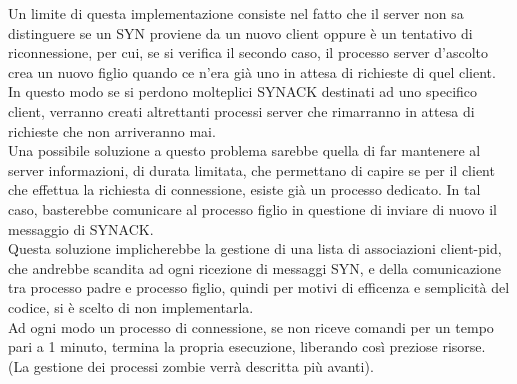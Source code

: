 Un limite di questa implementazione consiste nel fatto che il server non sa distinguere se un SYN proviene da un nuovo client oppure è un tentativo di riconnessione, per cui, se si verifica il secondo caso, il processo server d'ascolto crea un nuovo figlio quando ce n'era già uno in attesa di richieste di quel client.
In questo modo se si perdono molteplici SYNACK destinati ad uno specifico client, verranno creati altrettanti processi server che rimarranno in attesa di richieste che non arriveranno mai.\\
Una possibile soluzione a questo problema sarebbe quella di far mantenere al server informazioni, di durata limitata, che permettano di capire se per il client che effettua la richiesta di connessione, esiste già un processo dedicato. In tal caso, basterebbe comunicare al processo figlio in questione di inviare di nuovo il messaggio di SYNACK.\\
Questa soluzione implicherebbe la gestione di una lista di associazioni client-pid, che andrebbe scandita ad ogni ricezione di messaggi SYN, e della comunicazione tra processo padre e processo figlio, quindi per motivi di efficenza e semplicità del codice, si è scelto di non implementarla.\\
Ad ogni modo un processo di connessione, se non riceve comandi per un tempo pari a 1 minuto, termina la propria esecuzione, liberando così preziose risorse.\\
(La gestione dei processi zombie verrà descritta più avanti).
